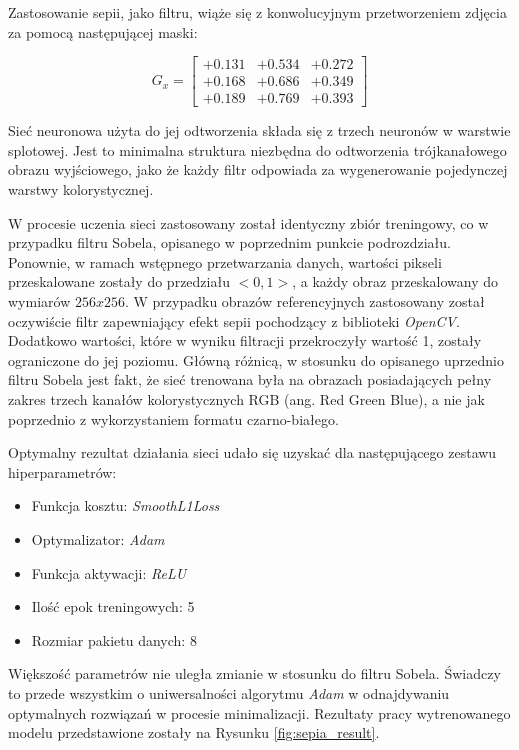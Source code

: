     Zastosowanie sepii, jako filtru, wiąże się z konwolucyjnym przetworzeniem
    zdjęcia za pomocą następującej maski:

    \[G_x =
    \begin{bmatrix}
    +0.131 & +0.534 & +0.272 \\
    +0.168 & +0.686 & +0.349 \\
    +0.189 & +0.769 & +0.393
    \end{bmatrix}
    \]

    Sieć neuronowa użyta do jej odtworzenia składa się z trzech neuronów w
    warstwie splotowej. Jest to minimalna struktura niezbędna do odtworzenia
    trójkanałowego obrazu wyjściowego, jako że każdy filtr odpowiada za wygenerowanie
    pojedynczej warstwy kolorystycznej.

    W procesie uczenia sieci zastosowany został identyczny zbiór treningowy, co w
    przypadku filtru Sobela, opisanego w poprzednim punkcie podrozdziału. Ponownie, w ramach
    wstępnego przetwarzania danych, wartości pikseli przeskalowane zostały do przedziału
    $<0,1>$, a każdy obraz przeskalowany do wymiarów $256x256$. W przypadku obrazów
    referencyjnych zastosowany został oczywiście filtr zapewniający efekt sepii
    pochodzący z biblioteki \textit{OpenCV}. Dodatkowo wartości, które w wyniku filtracji
    przekroczyły wartość 1, zostały ograniczone do jej poziomu. Główną różnicą, w stosunku
    do opisanego uprzednio filtru Sobela jest fakt, że sieć trenowana była na
    obrazach posiadających pełny zakres trzech kanałów kolorystycznych RGB
    (ang. Red Green Blue), a nie jak
    poprzednio z wykorzystaniem formatu czarno-białego.

    Optymalny rezultat działania sieci udało się uzyskać dla następującego
    zestawu hiperparametrów:

    \begin{itemize}
    \item Funkcja kosztu: \textit{SmoothL1Loss}
    \item Optymalizator: \textit{Adam}
    \item Funkcja aktywacji: \textit{ReLU}
    \item Ilość epok treningowych: 5
    \item Rozmiar pakietu danych: 8
    \end{itemize}

    Większość parametrów nie uległa zmianie w stosunku do filtru Sobela. Świadczy to
    przede wszystkim o uniwersalności algorytmu \textit{Adam} w odnajdywaniu optymalnych
    rozwiązań w procesie minimalizacji. Rezultaty pracy wytrenowanego modelu przedstawione
    zostały na Rysunku \ref{fig:sepia_result}.

